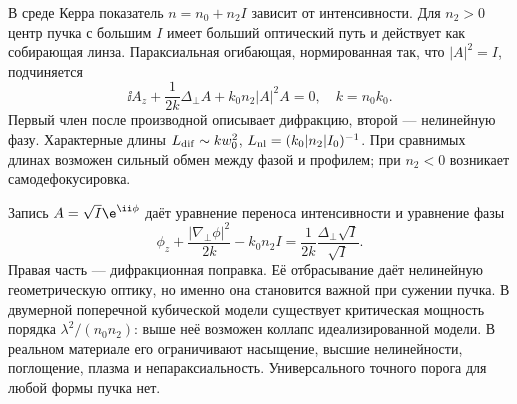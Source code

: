 
В среде Керра показатель $n=n_0+n_2I$ зависит от интенсивности. Для $n_2>0$ центр пучка с большим $I$ имеет больший оптический путь и действует как собирающая линза. Параксиальная огибающая, нормированная так, что $|A|^2=I$, подчиняется
\begin{equation}
 \ii A_z+\frac1{2k}\Delta_\perp A+k_0n_2|A|^2A=0,
 \quad k=n_0k_0.
\end{equation}
Первый член после производной описывает дифракцию, второй — нелинейную фазу. Характерные длины $L_{\rm dif}\sim kw_0^2$, $L_{\rm nl}=(k_0|n_2|I_0)^{-1}$. При сравнимых длинах возможен сильный обмен между фазой и профилем; при $n_2<0$ возникает самодефокусировка.

Запись $A=\sqrt I\e^{\ii\phi}$ даёт уравнение переноса интенсивности и уравнение фазы
\begin{equation}
 \phi_z+\frac{|\nabla_\perp\phi|^2}{2k}-k_0n_2I
 =\frac1{2k}\frac{\Delta_\perp\sqrt I}{\sqrt I}.
\end{equation}
Правая часть — дифракционная поправка. Её отбрасывание даёт нелинейную геометрическую оптику, но именно она становится важной при сужении пучка. В двумерной поперечной кубической модели существует критическая мощность порядка $\lambda^2/(n_0n_2)$: выше неё возможен коллапс идеализированной модели. В реальном материале его ограничивают насыщение, высшие нелинейности, поглощение, плазма и непараксиальность. Универсального точного порога для любой формы пучка нет.
